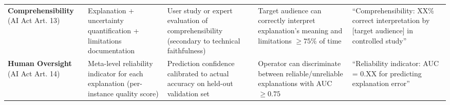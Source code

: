 \begin{landscape}
\begin{table}[h]
\begin{tabular}{@{}p{3cm}p{3.5cm}p{3cm}p{2.5cm}p{3cm}@{}}
\addlinespace
\textbf{Comprehensibility} (AI Act Art. 13) &
Explanation + uncertainty quantification + limitations documentation &
User study or expert evaluation of comprehensibility (secondary to technical faithfulness) &
Target audience can correctly interpret explanation's meaning and limitations $\geq 75\%$ of time &
``Comprehensibility: XX\% correct interpretation by [target audience] in controlled study'' \\
\addlinespace
\textbf{Human Oversight} (AI Act Art. 14) &
Meta-level reliability indicator for each explanation (per-instance quality score) &
Prediction confidence calibrated to actual accuracy on held-out validation set &
Operator can discriminate between reliable/unreliable explanations with AUC $\geq 0.75$ &
``Reliability indicator: AUC = 0.XX for predicting explanation error'' \\
\bottomrule
\end{tabular}
\end{table}
\end{landscape}
